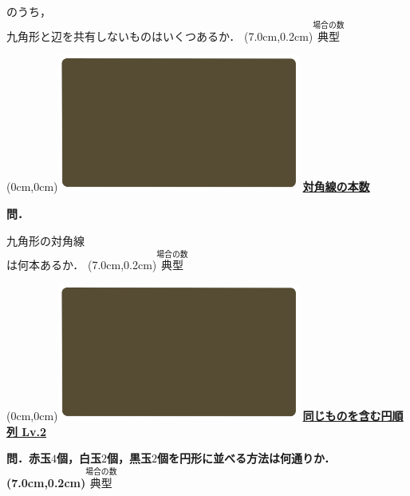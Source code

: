 \documentclass[10pt,
fleqn,
dvipdfmx,
uplatex
]{jsarticle}
\begin{document}
\normalsize
\vspace{-0.2zw}
のうち，\vspace{-0.2zw}\\
\hfill 九角形と辺を共有しないものはいくつあるか．
\at(7.0cm,0.2cm){\small\color{bradorange}$\overset{\text{場合の数}}{\text{典型}}$}


\newpage



\at(0cm,0cm){\includegraphics[width=8cm,bb=0 0 1920 1080]{./youtube/thumbnails/templates/smart_background/場合の数.jpeg}}
{\color{orange}\bf\boldmath\huge\underline{対角線の本数}}\vspace{0.3zw}

\large
\bf\boldmath 問．

\HUGE
\vspace{-0.6zw}
\hspace{0.00zw}
九角形の対角線\\
\hfill は何本あるか．
\at(7.0cm,0.2cm){\small\color{bradorange}$\overset{\text{場合の数}}{\text{典型}}$}


\newpage



\at(0cm,0cm){\includegraphics[width=8cm,bb=0 0 1920 1080]{./youtube/thumbnails/templates/smart_background/場合の数.jpeg}}
{\color{orange}\bf\boldmath\Large\underline{同じものを含む円順列 Lv.2 }}\vspace{0.3zw}

\huge 
\bf\boldmath 問．赤玉$4$個，白玉$2$個，黒玉$2$個を円形に並べる方法は何通りか．
\at(7.0cm,0.2cm){\small\color{bradorange}$\overset{\text{場合の数}}{\text{典型}}$}
\end{document}
